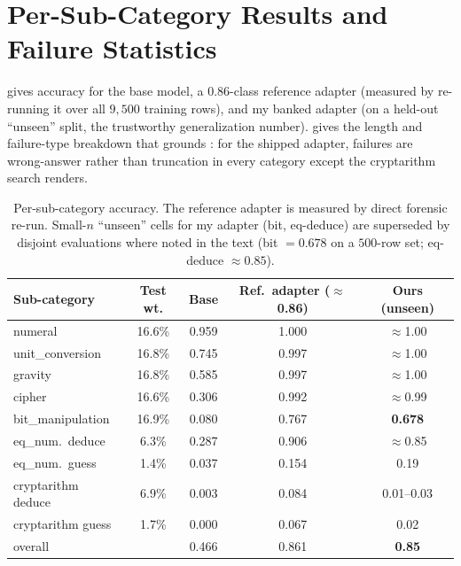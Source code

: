 \documentclass[11pt]{article}
\begin{document}
\section{Per-Sub-Category Results and Failure Statistics}
\label{app:failstats}

 gives accuracy for the base model, a $0.86$-class reference adapter
(measured by re-running it over all $9{,}500$ training rows), and my banked adapter (on a
held-out ``unseen'' split, the trustworthy generalization number).  gives
the length and failure-type breakdown that grounds : for the shipped
adapter, failures are wrong-answer rather than truncation in every category except the
cryptarithm search renders.

\begin{table}[htbp]
\centering
\caption{Per-sub-category accuracy. The reference adapter is measured by direct forensic
re-run. Small-$n$ ``unseen'' cells for my adapter (bit, eq-deduce) are superseded by
disjoint evaluations where noted in the text (bit $=0.678$ on a $500$-row set; eq-deduce
$\approx\!0.85$).}
\label{tab:persubcat}
\small
\begin{tabular}{l c c c c}
\toprule
Sub-category & Test wt. & Base & Ref.\ adapter ($\approx$0.86) & Ours (unseen) \\
\midrule
numeral            & 16.6\% & 0.959 & 1.000 & $\approx$1.00 \\
unit\_conversion   & 16.8\% & 0.745 & 0.997 & $\approx$1.00 \\
gravity            & 16.8\% & 0.585 & 0.997 & $\approx$1.00 \\
cipher             & 16.6\% & 0.306 & 0.992 & $\approx$0.99 \\
bit\_manipulation  & 16.9\% & 0.080 & 0.767 & \textbf{0.678} \\
eq\_num.\ deduce   & 6.3\%  & 0.287 & 0.906 & $\approx$0.85 \\
eq\_num.\ guess    & 1.4\%  & 0.037 & 0.154 & 0.19 \\
cryptarithm deduce & 6.9\%  & 0.003 & 0.084 & 0.01--0.03 \\
cryptarithm guess  & 1.7\%  & 0.000 & 0.067 & 0.02 \\
\midrule
\multicolumn{2}{l}{overall} & 0.466 & 0.861 & \textbf{0.85} \\
\bottomrule
\end{tabular}
\end{table}
\end{document}
